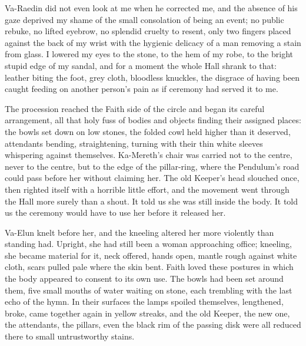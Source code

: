 
Va-Raedin did not even look at me when he corrected me, and the absence of his gaze deprived my shame of the small consolation of being an event; 
no public rebuke, no lifted eyebrow, no splendid cruelty to resent, only two fingers placed against the back of my wrist with the hygienic delicacy 
of a man removing a stain from glass. 
I lowered my eyes to the stone, to the hem of my robe, to the bright stupid edge of my sandal, and for a moment the whole Hall shrank to that: 
leather biting the foot, grey cloth, bloodless knuckles, the disgrace of having been caught feeding on another person’s pain as if ceremony had served it to me.\par

The procession reached the Faith side of the circle and began its careful arrangement, all that holy fuss of bodies and objects finding their assigned places: 
the bowls set down on low stones, the folded cowl held higher than it deserved, attendants bending, straightening, turning with their thin white sleeves 
whispering against themselves. 
Ka-Mereth’s chair was carried not to the centre, never to the centre, but to the edge of the pillar-ring, where the Pendulum’s road could pass before her without claiming her. 
The old Keeper’s head slouched once, then righted itself with a horrible little effort, and the movement went through the Hall more surely than a shout. 
It told us she was still inside the body. 
It told us the ceremony would have to use her before it released her.\par


Va-Elun knelt before her, and the kneeling altered her more violently than standing had. 
Upright, she had still been a woman approaching office; kneeling, she became material for it, neck offered, hands open, mantle rough against white cloth, 
scars pulled pale where the skin bent. 
Faith loved these postures in which the body appeared to consent to its own use. 
The bowls had been set around them, five small mouths of water waiting on stone, each trembling with the last echo of the hymn. 
In their surfaces the lamps spoiled themselves, lengthened, broke, came together again in yellow streaks, and the old Keeper, 
the new one, the attendants, the pillars, even the black rim of the passing disk were all reduced there to small untrustworthy stains.\par

